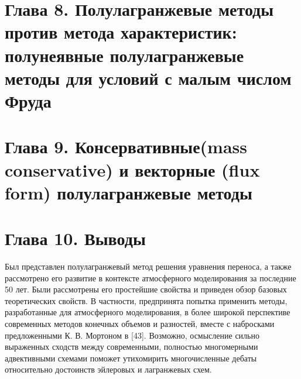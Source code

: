 \chapter*{Глава 8. Полулагранжевые методы против метода характеристик: полунеявные полулагранжевые методы
	 для условий с малым числом Фруда} \label{chapt_8}
\chapter*{Глава 9. Консервативные(mass conservative) и векторные (flux form) полулагранжевые методы} \label{chapt_9}
\newpage
\chapter*{Глава 10. Выводы} \label{chapt_10}
Был представлен полулагранжевый метод решения уравнения переноса, а также рассмотрено его развитие в контексте атмосферного моделирования за последние 50 лет. Были рассмотрены его простейшие свойства и приведен обзор базовых теоретических свойств. В частности, предпринята попытка применить методы, разработанные для атмосферного моделирования, в более широкой перспективе современных методов конечных объемов и разностей, вместе с набросками предложенными К. В. Мортоном в [43]. Возможно, осмысление сильно выраженных сходств между современными, полностью многомерными адвективными схемами поможет утихомирить многочисленные дебаты относительно достоинств эйлеровых и лагранжевых схем.
